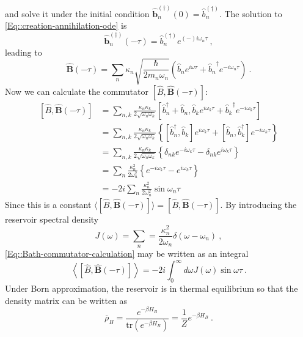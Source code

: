 	and solve it under the initial condition $\boldsymbol{\hat{b}}_n^{(\dagger)}(0) = \hat{b}_n^{(\dagger)}	$. The solution to \autoref{Eq::creation-annihilation-ode} is
	\begin{equation}
		\boldsymbol{\hat{b}}_n^{(\dagger)}(-\tau) = \hat{b}_n^{(\dagger)} e^{(-)i\omega_n \tau}~,
	\end{equation}
	leading to
	\begin{equation}
		\boldsymbol{\hat{B}}(-\tau) =	\sum_n \kappa_n \sqrt{\frac{\hbar}{2 m_n \omega_n}} \left({\hat{b}_n}e^{i \omega \tau} + {\hat{b}_n}^\dagger e^{-i \omega_n \tau} \right)~.
	\end{equation}
	Now we can calculate the commutator $[\hat{B}, \boldsymbol{\hat{B}}(-\tau) ]$:
	\begin{equation} \label{Eq::Bath-commutator-calculation}
		\begin{split}
			\left[\hat{B}, \boldsymbol{\hat{B}}(-\tau) \right] &=	\sum_{n,k}^{} \frac{\kappa_n \kappa_k}{2 \sqrt{\omega_n \omega_k}} \left[\hat{b}_n^\dagger + \hat{b}_n , {\hat{b}_k}e^{i \omega_k \tau} + {\hat{b}_k}^\dagger e^{-i \omega_k \tau} \right] \\
			&= \sum_{n,k}^{} \frac{\kappa_n \kappa_k}{2 \sqrt{\omega_n \omega_k}} \left\{\left[\hat{b}_n^\dagger, \hat{b}_k\right] e^{i\omega_k \tau} + \left[\hat{b}_n, \hat{b}_k^\dagger\right] e^{-i\omega_k \tau}\right\} \\
			&= \sum_{n,k}^{} \frac{\kappa_n \kappa_k}{2 \sqrt{\omega_n \omega_k}} \left\{\delta_{nk} e^{-i\omega_k \tau} - \delta_{nk} e^{i\omega_k \tau}\right\} \\
			&= \sum_{n}^{} \frac{\kappa_n^2 }{2 {\omega_n^2}} \left\{e^{-i\omega_k \tau} - e^{i\omega_k \tau}\right\} \\
			&= - 2 i  \sum_{n}^{} \frac{\kappa_n^2 }{2 {\omega_n^2}} \sin \omega_n \tau
		\end{split}
	\end{equation}
	Since this is a constant $\langle [\hat{B}, \boldsymbol{\hat{B}}(-\tau) ]  \rangle =	[\hat{B}, \boldsymbol{\hat{B}}(-\tau) ]$. By introducing the reservoir spectral density
	\begin{equation}
		J(\omega) =	\sum_n =	\frac{\kappa_n^2}{2 \omega_n} \delta(\omega - \omega_n)~,
	\end{equation}
	\autoref{Eq::Bath-commutator-calculation} may be written as an integral
	\begin{equation}
		\left\langle \left[\hat{B}, \boldsymbol{\hat{B}}(-\tau) \right] \right \rangle = -2i \int_{0}^{\infty} d\omega J(\omega) \sin \omega \tau~.
	\end{equation}
	Under Born approximation, the reservoir is in thermal equilibrium so that the density matrix can be written as
	\begin{equation}
		\overline{\rho}_B =	\frac{e^{-\beta H_B}}{\text{tr}\left(e^{-\beta H_B}\right)}=\frac{1}{Z} e^{-\beta H_B}~.
	\end{equation}
